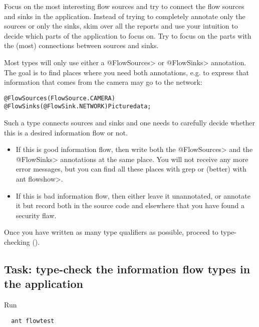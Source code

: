 Focus on the most interesting flow sources and try to connect the flow
sources and sinks in the application. Instead of trying to completely
annotate only the sources or only the sinks, skim over all the reports
and use your intuition to decide which parts of the application to
focus on. Try to focus on the parts with the (most) connections
between sources and sinks.

Most types will only use either a \<@FlowSources> or \<@FlowSinks>
annotation.
The goal is to find places where you need both annotations, e.g. to
express that information that comes from the camera may go to the
network:

\begin{alltt}
    @FlowSources(FlowSource.CAMERA)
    @FlowSinks(@FlowSink.NETWORK) Picture data;
\end{alltt}

Such a type connects sources and sinks and one needs to carefully
decide whether this is a desired information flow or not.
\begin{itemize}
\item If this is good information flow, then write both the \<@FlowSources>
  and the \<@FlowSinks> annotations at the same place. You will not
  receive any more error messages, but you can find all these places
  with grep or (better) with \<ant flowshow>.
\item If this is bad information flow, then either leave it unannotated,
  or annotate it but record both in the source code and elsewhere that
  you have found a security flaw.
\end{itemize}


Once you have written as many type qualifiers as possible, proceed to
type-checking ().



\subsection{Task: type-check the information flow types in the application\label{sec:run-type-checker}}

Run

\begin{Verbatim}
  ant flowtest
\end{Verbatim}

